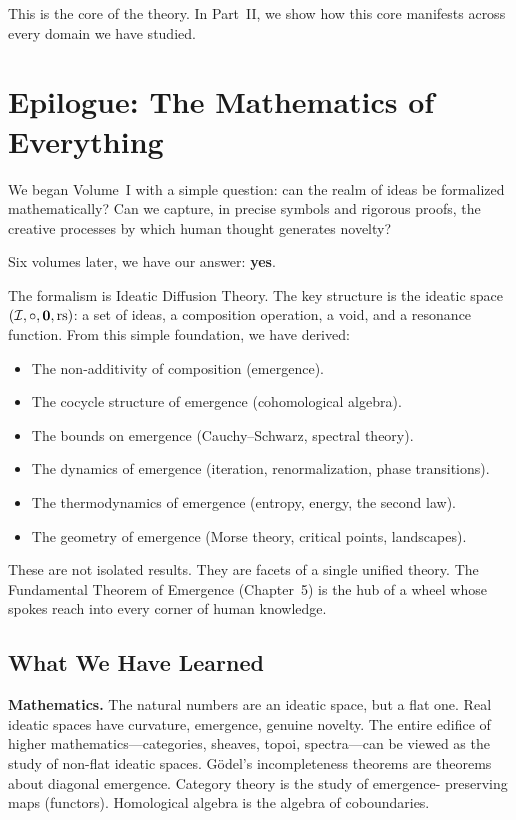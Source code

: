 This is the core of the theory. In Part~II, we show how this core manifests
across every domain we have studied.


\section{Epilogue: The Mathematics of Everything}

We began Volume~I with a simple question: can the realm of ideas be formalized
mathematically? Can we capture, in precise symbols and rigorous proofs, the
creative processes by which human thought generates novelty?

Six volumes later, we have our answer: \textbf{yes}.

The formalism is Ideatic Diffusion Theory. The key structure is the ideatic
space $(\mathcal{I}, \circ, \mathbf{0}, \mathrm{rs})$: a set of ideas, a composition
operation, a void, and a resonance function. From this simple foundation, we
have derived:
\begin{itemize}
  \item The non-additivity of composition (emergence).
  \item The cocycle structure of emergence (cohomological algebra).
  \item The bounds on emergence (Cauchy--Schwarz, spectral theory).
  \item The dynamics of emergence (iteration, renormalization, phase transitions).
  \item The thermodynamics of emergence (entropy, energy, the second law).
  \item The geometry of emergence (Morse theory, critical points, landscapes).
\end{itemize}

These are not isolated results. They are facets of a single unified theory. The
Fundamental Theorem of Emergence (Chapter~5) is the hub of a wheel whose spokes
reach into every corner of human knowledge.

\subsection{What We Have Learned}

\textbf{Mathematics.} The natural numbers are an ideatic space, but a flat one.
Real ideatic spaces have curvature, emergence, genuine novelty. The entire edifice
of higher mathematics---categories, sheaves, topoi, spectra---can be viewed as
the study of non-flat ideatic spaces. Gödel's incompleteness theorems are
theorems about diagonal emergence. Category theory is the study of emergence-
preserving maps (functors). Homological algebra is the algebra of coboundaries.

